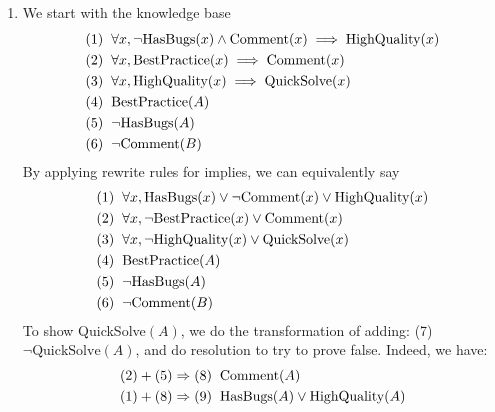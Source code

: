 \documentclass[10pt]{article}
\begin{document}
\begin{enumerate}
    \item We start with the knowledge base 
    \begin{align*} 
      (1) \hspace*{2mm}& \forall x, \neg \text{HasBugs}(x) \land \text{Comment}(x) \implies \text{HighQuality}(x) \\
      (2) \hspace*{2mm}& \forall x, \text{BestPractice}(x) \implies \text{Comment}(x) \\
      (3) \hspace*{2mm}& \forall x, \text{HighQuality}(x) \implies \text{QuickSolve}(x) \\
      (4) \hspace*{2mm}& \text{BestPractice}(A) \\
      (5) \hspace*{2mm}& \neg \text{HasBugs}(A) \\
      (6) \hspace*{2mm}& \neg \text{Comment}(B)
    \end{align*}
    By applying rewrite rules for implies, we can equivalently say 
    \begin{align*} 
      (1) \hspace*{2mm}& \forall x, \text{HasBugs}(x) \lor \neg \text{Comment}(x) \lor \text{HighQuality}(x) \\
      (2) \hspace*{2mm}& \forall x, \neg \text{BestPractice}(x) \lor \text{Comment}(x) \\
      (3) \hspace*{2mm}& \forall x, \neg \text{HighQuality}(x) \lor \text{QuickSolve}(x) \\
      (4) \hspace*{2mm}& \text{BestPractice}(A) \\
      (5) \hspace*{2mm}& \neg \text{HasBugs}(A) \\
      (6) \hspace*{2mm}& \neg \text{Comment}(B)
    \end{align*}
    To show QuickSolve\((A)\), we do the transformation of adding: (7) \(\neg \text{QuickSolve}(A)\), and do resolution to try to prove false. Indeed, we have: 
    \begin{align*}
      (2) + (5) \Rightarrow (8) \hspace*{2mm}& \text{Comment}(A) \\
      (1) + (8) \Rightarrow (9) \hspace*{2mm}& \text{HasBugs}(A) \lor \text{HighQuality}(A) \\

\end{align*}
\end{enumerate}
\end{document}

